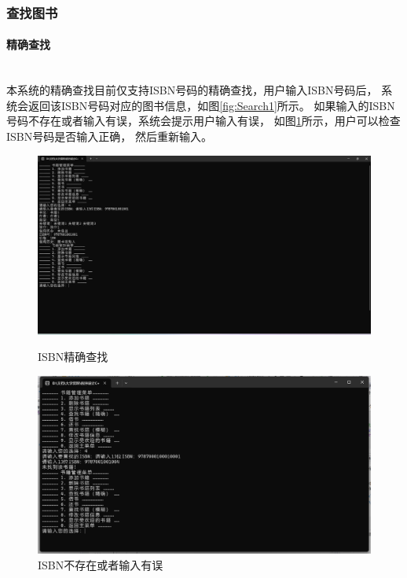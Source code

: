 \documentclass[12pt,twoside]{ctexart}
\begin{document}
\subsubsection{查找图书}

\paragraph{精确查找}\mbox{}\\

本系统的精确查找目前仅支持ISBN号码的精确查找，用户输入ISBN号码后，
系统会返回该ISBN号码对应的图书信息，如图\ref{fig:Search1}所示。
如果输入的ISBN号码不存在或者输入有误，系统会提示用户输入有误，
如图\ref{fig:Search11}所示，用户可以检查ISBN号码是否输入正确，
然后重新输入。

\begin{figure}[H]
    \centering
    \begin{minipage}[c]{0.48\textwidth}
        \centering
        \includegraphics[width=\linewidth]{Book/Search1.png}
        \caption{ISBN精确查找}
        \label{fig:Search1}
    \end{minipage}
    \hfill
    \begin{minipage}[c]{0.48\textwidth}
        \centering
        \includegraphics[width=\linewidth]{Book/Search11.png}
        \caption{ISBN不存在或者输入有误}
        \label{fig:Search11}
    \end{minipage}
\end{figure}
\end{document}
